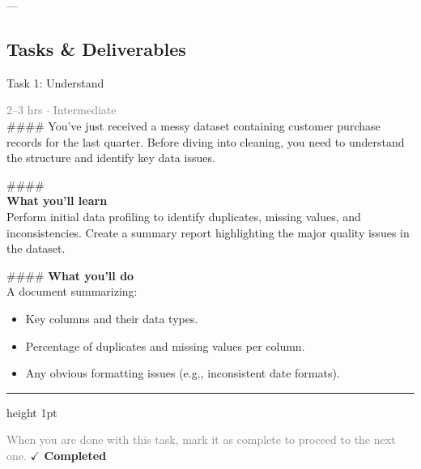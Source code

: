 \documentclass[10pt,a4paper]{article}
\begin{document}
---

\subsection*{Tasks \& Deliverables}

\begin{taskbox}{Task 1: Understand}

    {\small \textcolor{gray}{2--3 hrs $\cdot$ Intermediate}}\\[12pt]

    \#\#\#\#   
You've just received a messy dataset containing customer purchase records for the last quarter. Before diving into cleaning, you need to understand the structure and identify key data issues.

\#\#\#\# \\[10pt]
\vspace{8pt}
{\large \textbf{\textcolor{brandLight}{What you'll learn}}}\\[4pt]  
Perform initial data profiling to identify duplicates, missing values, and inconsistencies. Create a summary report highlighting the major quality issues in the dataset.

\#\#\#\# \vspace{8pt}
{\large \textbf{\textcolor{brandLight}{What you'll do}}}\\[4pt]  
A document summarizing:  
\begin{itemize}
    \item Key columns and their data types.  
    \item Percentage of duplicates and missing values per column.  
    \item Any obvious formatting issues (e.g., inconsistent date formats).\par
\end{itemize}

    \vspace{16pt}

    \textcolor{cardBorder}{\hrule height 1pt}\vspace{8pt}

    \small \textcolor{gray}{When you are done with this task, mark it as complete to proceed to the next one.} \hfill \textbf{\textcolor{brandDark}{$\checkmark$ Completed}}

\end{taskbox}
\end{document}
